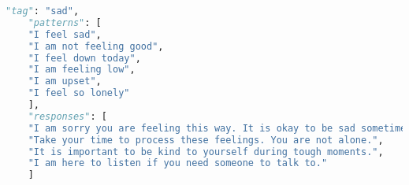 \begin{lstlisting}[language=Python, caption=esempio di file JSON]
	"tag": "sad",
	"patterns": [
	"I feel sad",
	"I am not feeling good",
	"I feel down today",
	"I am feeling low",
	"I am upset",
	"I feel so lonely"
	],
	"responses": [
	"I am sorry you are feeling this way. It is okay to be sad sometimes.",
	"Take your time to process these feelings. You are not alone.",
	"It is important to be kind to yourself during tough moments.",
	"I am here to listen if you need someone to talk to."
	]
\end{lstlisting}
	